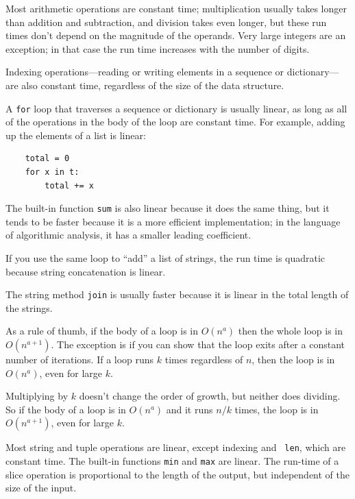 \documentclass[10pt]{book}
\begin{document}
Most arithmetic operations are constant time; multiplication
usually takes longer than addition and subtraction, and division
takes even longer, but these run times don't
depend on the magnitude of the operands.  Very large integers
are an exception; in that case the run time increases
with the number of digits.

Indexing operations---reading or writing elements in a sequence
or dictionary---are also constant time, regardless of the size
of the data structure.

A {\tt for} loop that traverses a sequence or dictionary is
usually linear, as long as all of the operations in the body
of the loop are constant time.  For example, adding up the
elements of a list is linear:

\begin{verbatim}
    total = 0
    for x in t:
        total += x
\end{verbatim}

The built-in function {\tt sum} is also linear because it does
the same thing, but it tends to be faster because it is a more
efficient implementation; in the language of algorithmic analysis,
it has a smaller leading coefficient.

If you use the same loop to ``add'' a list of strings, the
run time is quadratic
because string concatenation is linear.

The string method {\tt join} is usually faster because it is
linear in the total length of the strings.

As a rule of thumb, if the body of a loop is in $O(n^a)$ then
the whole loop is in $O(n^{a+1})$.  The exception is if you can
show that the loop exits after a constant number of iterations.
If a loop runs $k$ times regardless of $n$, then
the loop is in $O(n^a)$, even for large $k$.

Multiplying by $k$ doesn't change the order of growth, but neither
does dividing.  So if the body of a loop is in $O(n^a)$ and it runs $n
/ k$ times, the loop is in $O(n^{a+1})$, even for large $k$.

Most string and tuple operations are linear, except indexing and {\tt
  len}, which are constant time.  The built-in functions {\tt min} and
{\tt max} are linear.  The run-time of a slice operation is
proportional to the length of the output, but independent of the size
of the input.
\end{document}
